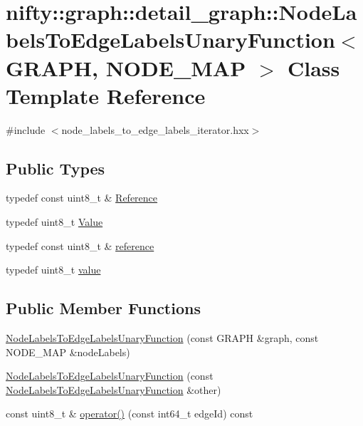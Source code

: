 \hypertarget{classnifty_1_1graph_1_1detail__graph_1_1NodeLabelsToEdgeLabelsUnaryFunction}{}\section{nifty\+:\+:graph\+:\+:detail\+\_\+graph\+:\+:Node\+Labels\+To\+Edge\+Labels\+Unary\+Function$<$ G\+R\+A\+P\+H, N\+O\+D\+E\+\_\+\+M\+A\+P $>$ Class Template Reference}
\label{classnifty_1_1graph_1_1detail__graph_1_1NodeLabelsToEdgeLabelsUnaryFunction}


{\ttfamily \#include $<$node\+\_\+labels\+\_\+to\+\_\+edge\+\_\+labels\+\_\+iterator.\+hxx$>$}

\subsection*{Public Types}
\begin{DoxyCompactItemize}
\item 
typedef const uint8\+\_\+t \& \hyperlink{classnifty_1_1graph_1_1detail__graph_1_1NodeLabelsToEdgeLabelsUnaryFunction_a50e0f9bfa5b0ce4c60fb0f010cd15110}{Reference}
\item 
typedef uint8\+\_\+t \hyperlink{classnifty_1_1graph_1_1detail__graph_1_1NodeLabelsToEdgeLabelsUnaryFunction_a69f2d0e0bef04e6172466755efee4a8e}{Value}
\item 
typedef const uint8\+\_\+t \& \hyperlink{classnifty_1_1graph_1_1detail__graph_1_1NodeLabelsToEdgeLabelsUnaryFunction_a298c22998b3dcc8aea86f29bb0e9c9b7}{reference}
\item 
typedef uint8\+\_\+t \hyperlink{classnifty_1_1graph_1_1detail__graph_1_1NodeLabelsToEdgeLabelsUnaryFunction_ab0985d82c405b9b0e4422751a2a8b18b}{value}
\end{DoxyCompactItemize}
\subsection*{Public Member Functions}
\begin{DoxyCompactItemize}
\item 
\hyperlink{classnifty_1_1graph_1_1detail__graph_1_1NodeLabelsToEdgeLabelsUnaryFunction_a27e93a8f9e44784d8c17e40fbf295db8}{Node\+Labels\+To\+Edge\+Labels\+Unary\+Function} (const G\+R\+A\+P\+H \&graph, const N\+O\+D\+E\+\_\+\+M\+A\+P \&node\+Labels)
\item 
\hyperlink{classnifty_1_1graph_1_1detail__graph_1_1NodeLabelsToEdgeLabelsUnaryFunction_a9325812abd92290323172cb501929d36}{Node\+Labels\+To\+Edge\+Labels\+Unary\+Function} (const \hyperlink{classnifty_1_1graph_1_1detail__graph_1_1NodeLabelsToEdgeLabelsUnaryFunction}{Node\+Labels\+To\+Edge\+Labels\+Unary\+Function} \&other)
\item 
const uint8\+\_\+t \& \hyperlink{classnifty_1_1graph_1_1detail__graph_1_1NodeLabelsToEdgeLabelsUnaryFunction_abdc5a66fc34a0e0b8323e12362452036}{operator()} (const int64\+\_\+t edge\+Id) const 
\end{DoxyCompactItemize}



